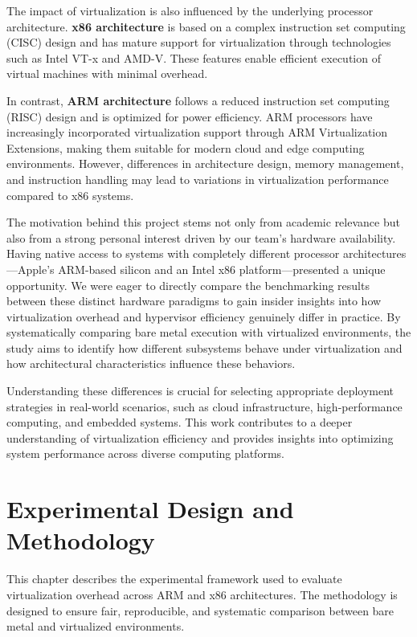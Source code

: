 \documentclass[conference]{IEEEtran}
\begin{document}
The impact of virtualization is also influenced by the underlying processor architecture. \textbf{x86 architecture} is based on a complex instruction set computing (CISC) design and has mature support for virtualization through technologies such as Intel VT-x and AMD-V. These features enable efficient execution of virtual machines with minimal overhead.

In contrast, \textbf{ARM architecture} follows a reduced instruction set computing (RISC) design and is optimized for power efficiency. ARM processors have increasingly incorporated virtualization support through ARM Virtualization Extensions, making them suitable for modern cloud and edge computing environments. However, differences in architecture design, memory management, and instruction handling may lead to variations in virtualization performance compared to x86 systems.

The motivation behind this project stems not only from academic relevance but also from a strong personal interest driven by our team's hardware availability. Having native access to systems with completely different processor architectures—Apple's ARM-based silicon and an Intel x86 platform—presented a unique opportunity. We were eager to directly compare the benchmarking results between these distinct hardware paradigms to gain insider insights into how virtualization overhead and hypervisor efficiency genuinely differ in practice. By systematically comparing bare metal execution with virtualized environments, the study aims to identify how different subsystems behave under virtualization and how architectural characteristics influence these behaviors.

Understanding these differences is crucial for selecting appropriate deployment strategies in real-world scenarios, such as cloud infrastructure, high-performance computing, and embedded systems. This work contributes to a deeper understanding of virtualization efficiency and provides insights into optimizing system performance across diverse computing platforms.

\section{Experimental Design and Methodology}

This chapter describes the experimental framework used to evaluate virtualization overhead across ARM and x86 architectures. The methodology is designed to ensure fair, reproducible, and systematic comparison between bare metal and virtualized environments.
\end{document}
